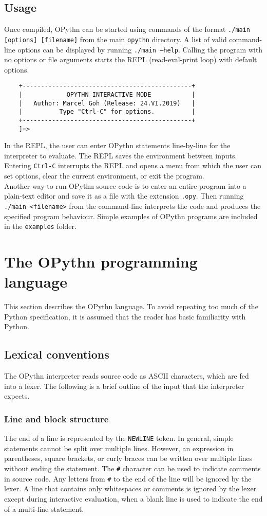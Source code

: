 \documentclass[11pt, twoside]{article}
\newcommand{\ms}{\texttt}
\begin{document}
    \subsection{Usage}
    Once compiled, OPythn can be started using commands of the format \ms{./main [options] [filename]} from the main \ms{opythn} directory. A list of valid command-line options can be displayed by running \ms{./main --help}. Calling the program with no options or file arguments starts the REPL (read-eval-print loop) with default options.
    \begin{lstlisting}
    +----------------------------------------------+
    |            OPYTHN INTERACTIVE MODE           |
    |   Author: Marcel Goh (Release: 24.VI.2019)   |
    |          Type "Ctrl-C" for options.          |
    +----------------------------------------------+
    ]=>
    \end{lstlisting}
    In the REPL, the user can enter OPythn statements line-by-line for the interpreter to evaluate. The REPL saves the environment between inputs. Entering \ms{Ctrl-C} interrupts the REPL and opens a menu from which the user can set options, clear the current environment, or exit the program.\\
    \indent Another way to run OPythn source code is to enter an entire program into a plain-text editor and save it as a file with the extension \ms{.opy}. Then running \ms{./main <filename>} from the command-line interprets the code and produces the specified program behaviour. Simple examples of OPythn programs are included in the \ms{examples} folder.

\section{The OPythn programming language}
    This section describes the OPythn language. To avoid repeating too much of the Python specification, it is assumed that the reader has basic familiarity with Python.
    \subsection{Lexical conventions}
    The OPythn interpreter reads source code as ASCII characters, which are fed into a lexer. The following is a brief outline of the input that the interpreter expects.
    \subsubsection{Line and block structure}
    The end of a line is represented by the \ms{NEWLINE} token. In general, simple statements cannot be split over multiple lines. However, an expression in parentheses, square brackets, or curly braces can be written over multiple lines without ending the statement. The \ms{\#} character can be used to indicate comments in source code. Any letters from \ms{\#} to the end of the line will be ignored by the lexer. A line that contains only whitespaces or comments is ignored by the lexer except during interactive evaluation, when a blank line is used to indicate the end of a multi-line statement.
\end{document}

